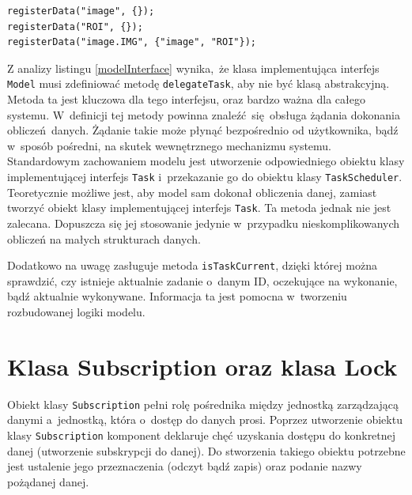 \begin{minipage}{\textwidth}
	\begin{lstlisting}[label=model:registerData, caption={Przykłady rejestrowania danych.},alsoletter={()[].=}]
registerData("image", {});
registerData("ROI", {});
registerData("image.IMG", {"image", "ROI"});
	\end{lstlisting}
\end{minipage}

Z analizy listingu \ref{modelInterface} wynika, że klasa implementująca interfejs \lstinline$Model$ musi zdefiniować metodę \lstinline$delegateTask$, aby nie być klasą abstrakcyjną. Metoda ta jest kluczowa dla tego interfejsu, oraz bardzo ważna dla całego systemu. W~definicji tej metody powinna znaleźć się obsługa żądania dokonania obliczeń danych. Żądanie takie może płynąć bezpośrednio od użytkownika, bądź w~sposób pośredni, na skutek wewnętrznego mechanizmu systemu. Standardowym zachowaniem modelu jest utworzenie odpowiedniego obiektu klasy implementującej interfejs \lstinline$Task$ i~przekazanie go do obiektu klasy \lstinline$TaskScheduler$. Teoretycznie możliwe jest, aby model sam dokonał obliczenia danej, zamiast tworzyć obiekt klasy implementującej interfejs \lstinline$Task$. Ta metoda jednak nie jest zalecana. Dopuszcza się jej stosowanie jedynie w~przypadku nieskomplikowanych obliczeń na małych strukturach danych. 

Dodatkowo na uwagę zasługuje metoda \lstinline$isTaskCurrent$, dzięki której można sprawdzić, czy istnieje aktualnie zadanie o~danym ID, oczekujące na wykonanie, bądź aktualnie wykonywane. Informacja ta jest pomocna w~tworzeniu rozbudowanej logiki modelu.

\section{Klasa Subscription oraz klasa Lock}
Obiekt klasy \lstinline$Subscription$ pełni rolę pośrednika między jednostką zarządzającą danymi a~jednostką, która o~dostęp do danych prosi. Poprzez utworzenie obiektu klasy \lstinline$Subscription$ komponent deklaruje chęć uzyskania dostępu do konkretnej danej (utworzenie subskrypcji do danej). Do stworzenia takiego obiektu potrzebne jest ustalenie jego przeznaczenia (odczyt bądź zapis) oraz podanie nazwy pożądanej danej.
 

